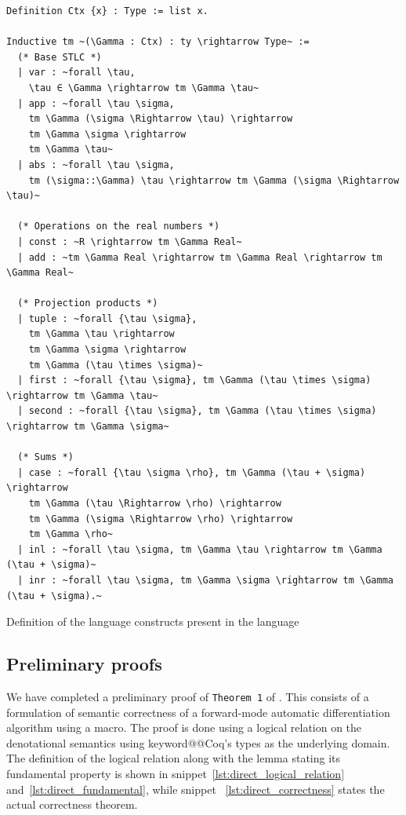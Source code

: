 \documentclass[12pt, final]{article}
\makeatletter
\def\<#1>{\csname keyword@@#1\endcsname}
\makeatother
\begin{document}
\begin{listing}
  \begin{verbatim}
Definition Ctx {x} : Type := list x.

Inductive tm ~(\Gamma : Ctx) : ty \rightarrow Type~ :=
  (* Base STLC *)
  | var : ~forall \tau,
    \tau ∈ \Gamma \rightarrow tm \Gamma \tau~
  | app : ~forall \tau \sigma,
    tm \Gamma (\sigma \Rightarrow \tau) \rightarrow
    tm \Gamma \sigma \rightarrow
    tm \Gamma \tau~
  | abs : ~forall \tau \sigma,
    tm (\sigma::\Gamma) \tau \rightarrow tm \Gamma (\sigma \Rightarrow \tau)~

  (* Operations on the real numbers *)
  | const : ~R \rightarrow tm \Gamma Real~
  | add : ~tm \Gamma Real \rightarrow tm \Gamma Real \rightarrow tm \Gamma Real~

  (* Projection products *)
  | tuple : ~forall {\tau \sigma},
    tm \Gamma \tau \rightarrow
    tm \Gamma \sigma \rightarrow
    tm \Gamma (\tau \times \sigma)~
  | first : ~forall {\tau \sigma}, tm \Gamma (\tau \times \sigma) \rightarrow tm \Gamma \tau~
  | second : ~forall {\tau \sigma}, tm \Gamma (\tau \times \sigma) \rightarrow tm \Gamma \sigma~

  (* Sums *)
  | case : ~forall {\tau \sigma \rho}, tm \Gamma (\tau + \sigma) \rightarrow
    tm \Gamma (\tau \Rightarrow \rho) \rightarrow
    tm \Gamma (\sigma \Rightarrow \rho) \rightarrow
    tm \Gamma \rho~
  | inl : ~forall \tau \sigma, tm \Gamma \tau \rightarrow tm \Gamma (\tau + \sigma)~
  | inr : ~forall \tau \sigma, tm \Gamma \sigma \rightarrow tm \Gamma (\tau + \sigma).~

  \end{verbatim}
  \caption{Definition of the language constructs present in the language}
  \label{lst:stlc_terms}
\end{listing}

\subsection{Preliminary proofs}

We have completed a preliminary proof of \texttt{Theorem 1} of \cite{huot2020correctness}. This consists of a formulation of semantic correctness of a forward-mode automatic differentiation algorithm using a macro. The proof is done using a logical relation on the denotational semantics using \<Coq>'s types as the underlying domain. The definition of the logical relation along with the lemma stating its fundamental property is shown in snippet~\ref{lst:direct_logical_relation} and~\ref{lst:direct_fundamental}, while snippet~ \ref{lst:direct_correctness} states the actual correctness theorem.
\end{document}
